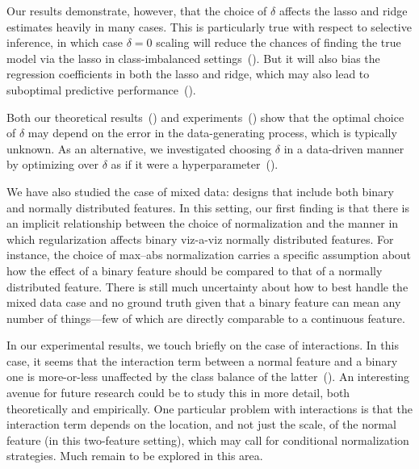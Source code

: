 Our results demonstrate, however, that the choice of \(\delta\) affects the lasso and ridge
estimates heavily in many cases. This is particularly true with respect to selective
inference, in which case \(\delta=0\) scaling will reduce the chances of finding the true
model via the lasso in class-imbalanced settings~(). But it
will also bias the regression coefficients in both the lasso and ridge, which may also lead
to suboptimal predictive performance~().

Both our theoretical results~() and
experiments~() show that the optimal choice of \(\delta\) may
depend on the error in the data-generating process, which is typically unknown. As an
alternative, we investigated choosing \(\delta\) in a data-driven manner by optimizing over
\(\delta\) as if it were a hyperparameter~().

We have also studied the case of mixed data: designs that include both binary and normally
distributed features. In this setting, our first finding is that there is an implicit
relationship between the choice of normalization and the manner in which regularization
affects binary viz-a-viz normally distributed features. For instance, the choice of
max--abs normalization carries a specific assumption about how the effect of a binary
feature should be compared to that of a normally distributed feature. There is still much
uncertainty about how to best handle the mixed data case and no ground truth given that a
binary feature can mean any number of things---few of which are directly comparable to a
continuous feature.

In our experimental results, we touch briefly on the case of interactions. In this case, it
seems that the interaction term between a normal feature and a binary one is more-or-less
unaffected by the class balance of the latter~(). An
interesting avenue for future research could be to study this in more detail, both
theoretically and empirically. One particular problem with interactions is that the
interaction term depends on the location, and not just the scale, of the normal feature (in
this two-feature setting), which may call for conditional normalization strategies. Much
remain to be explored in this area.

